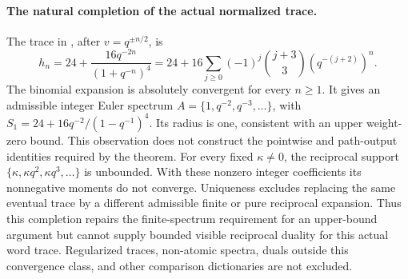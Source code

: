 \paragraph{The natural completion of the actual normalized trace.}
The trace in , after $v=q^{\pm n/2}$, is
\[
 h_n=24+\frac{16q^{-2n}}{(1+q^{-n})^4}
 =24+16\sum_{j\ge0}(-1)^j\binom{j+3}{3}
                   (q^{-(j+2)})^n.
\]
The binomial expansion is absolutely convergent for every $n\ge1$.
It gives an admissible integer Euler spectrum
$A=\{1,q^{-2},q^{-3},\ldots\}$, with
$S_1=24+16q^{-2}/(1-q^{-1})^4$. Its radius is one, consistent with
an upper weight-zero bound. This observation does not construct the
pointwise and path-output identities required by the theorem.
For every fixed $\kappa\ne0$, the reciprocal support
$\{\kappa,\kappa q^2,\kappa q^3,\ldots\}$ is unbounded.
With these nonzero integer coefficients its nonnegative moments do
not converge. Uniqueness excludes replacing the same eventual trace
by a different admissible finite or pure reciprocal expansion.
Thus this completion repairs the finite-spectrum requirement for an
upper-bound argument but cannot supply bounded visible reciprocal
duality for this actual word trace. Regularized traces, non-atomic
spectra, duals outside this convergence class, and other comparison
dictionaries are not excluded.
